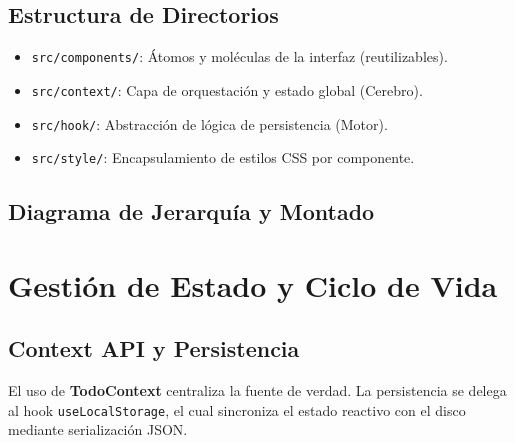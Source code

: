 \documentclass[12pt,a4paper]{article}
\begin{document}
\subsection{Estructura de Directorios}
\begin{itemize}
    \item \texttt{src/components/}: Átomos y moléculas de la interfaz (reutilizables).
    \item \texttt{src/context/}: Capa de orquestación y estado global (Cerebro).
    \item \texttt{src/hook/}: Abstracción de lógica de persistencia (Motor).
    \item \texttt{src/style/}: Encapsulamiento de estilos CSS por componente.
\end{itemize}

\subsection{Diagrama de Jerarquía y Montado}
\begin{center}
\end{center}

\section{Gestión de Estado y Ciclo de Vida}

\subsection{Context API y Persistencia}
El uso de \textbf{TodoContext} centraliza la fuente de verdad. La persistencia se delega al hook \texttt{useLocalStorage}, el cual sincroniza el estado reactivo con el disco mediante serialización JSON.
\end{document}
